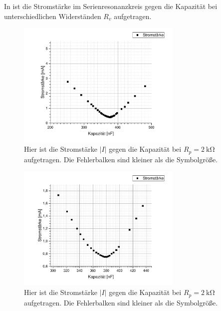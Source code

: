\documentclass[
	a4paper,
	12pt,
	pagesize,
	ngerman
]{scrartcl}
\begin{document}
	In  ist die Stromstärke im Serienresonanzkreis gegen die Kapazität bei unterschiedlichen Widerständen $ R_v $ aufgetragen.
	\begin{figure}[H]
		\includegraphics[width=0.7\textwidth]{Parallelstromkreis_inf}
		\centering
		\caption{Hier ist die Stromstärke $ \left| I \right| $ gegen die Kapazität bei $ R_p = \SI{2}{\kilo \ohm} $ aufgetragen. Die Fehlerbalken sind kleiner als die Symbolgröße.}
		\label{Para_2k}
		\centering
	\end{figure} 
	\begin{figure}[H]
		\includegraphics[width=0.7\textwidth]{Parallelstromkreis_10k}
		\centering
		\caption{Hier ist die Stromstärke $ \left| I \right| $ gegen die Kapazität bei $ R_p = \SI{2}{\kilo \ohm} $ aufgetragen. Die Fehlerbalken sind kleiner als die Symbolgröße.}
		\label{Para_10k}
		\centering
	\end{figure} 
\end{document}
